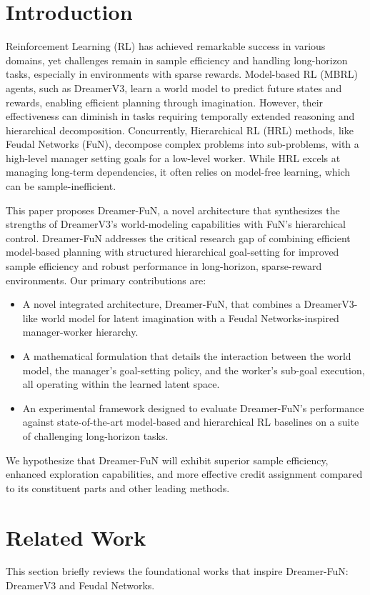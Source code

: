 \documentclass[conference]{IEEEtran}
\begin{document}
\section{Introduction}
Reinforcement Learning (RL) has achieved remarkable success in various domains, yet challenges remain in sample efficiency and handling long-horizon tasks, especially in environments with sparse rewards. Model-based RL (MBRL) agents, such as DreamerV3, learn a world model to predict future states and rewards, enabling efficient planning through imagination. However, their effectiveness can diminish in tasks requiring temporally extended reasoning and hierarchical decomposition. Concurrently, Hierarchical RL (HRL) methods, like Feudal Networks (FuN), decompose complex problems into sub-problems, with a high-level manager setting goals for a low-level worker. While HRL excels at managing long-term dependencies, it often relies on model-free learning, which can be sample-inefficient.

This paper proposes Dreamer-FuN, a novel architecture that synthesizes the strengths of DreamerV3's world-modeling capabilities with FuN's hierarchical control. Dreamer-FuN addresses the critical research gap of combining efficient model-based planning with structured hierarchical goal-setting for improved sample efficiency and robust performance in long-horizon, sparse-reward environments. Our primary contributions are:
\begin{itemize}
    \item A novel integrated architecture, Dreamer-FuN, that combines a DreamerV3-like world model for latent imagination with a Feudal Networks-inspired manager-worker hierarchy.
    \item A mathematical formulation that details the interaction between the world model, the manager's goal-setting policy, and the worker's sub-goal execution, all operating within the learned latent space.
    \item An experimental framework designed to evaluate Dreamer-FuN's performance against state-of-the-art model-based and hierarchical RL baselines on a suite of challenging long-horizon tasks.
\end{itemize}
We hypothesize that Dreamer-FuN will exhibit superior sample efficiency, enhanced exploration capabilities, and more effective credit assignment compared to its constituent parts and other leading methods.

\section{Related Work}
This section briefly reviews the foundational works that inspire Dreamer-FuN: DreamerV3 and Feudal Networks.
\end{document}
